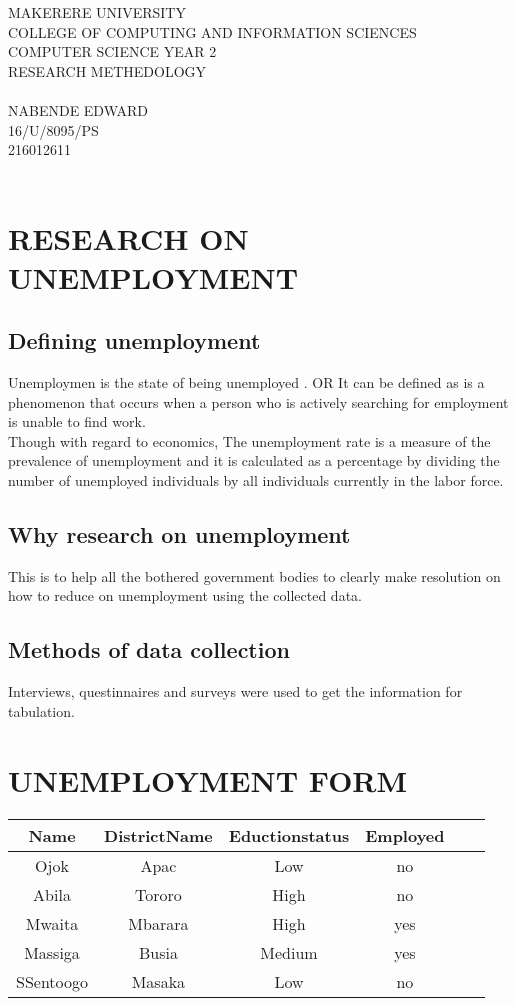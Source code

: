 \documentclass[a4paper, 12pt]{article}
\begin{document}
MAKERERE UNIVERSITY\\
COLLEGE OF COMPUTING AND INFORMATION SCIENCES\\
COMPUTER SCIENCE YEAR 2\\
RESEARCH METHEDOLOGY\\ \\

NABENDE EDWARD\\
\textmd{16/U/8095/PS}\\
\textmd{216012611}\\ \\

 \section{  RESEARCH ON UNEMPLOYMENT} 
\subsection{Defining unemployment}

Unemploymen is the state of being unemployed . OR It can be defined as  is a phenomenon that occurs when a person who is actively searching for employment is unable to find work.\\
Though with regard to economics, The unemployment rate is a measure of the prevalence of unemployment and it is calculated as a percentage by dividing the number of unemployed individuals by all individuals currently in the labor force.
\subsection{Why research on unemployment}
This is to help all the bothered government bodies to clearly make resolution  on how to reduce on  unemployment using  the collected data.
\subsection{Methods of data collection}
Interviews, questinnaires and surveys were used to get the information for tabulation.

\section{UNEMPLOYMENT FORM}


\begin{tabular}{|c|c|c|c|c|c|}
\hline
Name& DistrictName &Eductionstatus& Employed \\ [0.5ex]
\hline
Ojok & Apac & Low & no\\ [0.5ex]
\hline
Abila & Tororo & High & no \\ [0.5ex]
\hline
Mwaita & Mbarara & High& yes\\ [0.5ex]
\hline
Massiga & Busia & Medium&yes\\ [0.5ex]
\hline
SSentoogo & Masaka & Low & no\\ [0.5ex]
\hline
\end{tabular}
\end{document}

